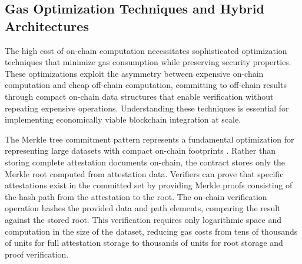 \subsection{Gas Optimization Techniques and Hybrid Architectures}

The high cost of on-chain computation necessitates sophisticated optimization techniques that minimize gas consumption while preserving security properties. These optimizations exploit the asymmetry between expensive on-chain computation and cheap off-chain computation, committing to off-chain results through compact on-chain data structures that enable verification without repeating expensive operations. Understanding these techniques is essential for implementing economically viable blockchain integration at scale.

The Merkle tree commitment pattern represents a fundamental optimization for representing large datasets with compact on-chain footprints \cite{merkle_trees}. Rather than storing complete attestation documents on-chain, the contract stores only the Merkle root computed from attestation data. Verifiers can prove that specific attestations exist in the committed set by providing Merkle proofs consisting of the hash path from the attestation to the root. The on-chain verification operation hashes the provided data and path elements, comparing the result against the stored root. This verification requires only logarithmic space and computation in the size of the dataset, reducing gas costs from tens of thousands of units for full attestation storage to thousands of units for root storage and proof verification.

